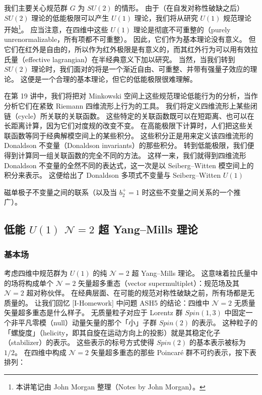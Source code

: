 我们主要关心规范群 $G$ 为 $SU(2)$ 的情形。
由于（在自发对称性破缺之后）$SU(2)$ 理论的低能极限可以产生 $U(1)$ 理论，我们将从研究 $U(1)$ 规范理论开始\footnote{本讲笔记由 John Morgan 整理（Notes by John Morgan）。}。
应当注意，在四维中这些 $U(1)$ 理论是彻底不可重整的（purely unrenormalizable，所有项都不可重整）。
因此，它们作为基本理论没有意义。
但它们在红外是自由的，所以作为红外极限是有意义的，而其红外行为可以用有效拉氏量（effective lagrangian）在半经典意义下加以研究。
当然，当我们转到 $SU(2)$ 理论时，我们面对的将是一个渐近自由、可重整、并带有强量子效应的理论。
这便是一个合理的基本理论，但它的低能极限很难理解。

在第 19 讲中，我们将把对 Minkowski 空间上这些规范理论低能行为的分析，当作分析它们在紧致 Riemann 四维流形上行为的工具。
我们将定义四维流形上某些闭链（cycle）所关联的关联函数。
这些特定的关联函数既可以在短距离、也可以在长距离计算，因为它们对度规的改变不变。
在高能极限下计算时，人们把这些关联函数等同于经典解模空间上的某些积分。
这些积分正是用来定义该四维流形的 Donaldson 不变量（Donaldson invariants）的那些积分。
转到低能极限，我们便得到计算同一组关联函数的完全不同的方法。
这样一来，我们就得到四维流形 Donaldson 不变量的全然不同的表达式，这一次是以 Seiberg--Witten 模空间上的积分来表示。
这便给出了 Donaldson 多项式不变量与 Seiberg--Witten $U(1)$


磁单极子不变量之间的联系（以及当 $b_2^+=1$ 时这些不变量之间关系的一个推广）。

\subsection{低能 $U(1)$ $\mathcal{N}=2$ 超 Yang--Mills 理论}

\subsubsection{基本场}

考虑四维中规范群为 $U(1)$ 的纯 $\mathcal{N}=2$ 超 Yang--Mills 理论。
这意味着拉氏量中的场将构成单个 $\mathcal{N}=2$ 矢量超多重态（vector supermultiplet）：规范场及其 $\mathcal{N}=2$ 超对称伙伴。
在经典层面、在可能的规范对称性破缺之前，所有场都是无质量的。
让我们回忆 [I-Homework] 中问题 ASH5 的结论：四维中 $\mathcal{N}=2$ 无质量矢量超多重态是什么样子。
无质量粒子对应于 Lorentz 群 $Spin(1,3)$ 中固定一个非平凡零模（null）动量矢量的那个「小」子群 $Spin(2)$ 的表示。
这种粒子的「螺旋度」（helicity，即其自旋在运动方向上的投影）就是其稳定化子（stabilizer）的表示。
这些表示的标号方式使得 $Spin(2)$ 的基本表示被标为 $1/2$。
在四维中构成 $\mathcal{N}=2$ 矢量超多重态的那些 Poincaré 群不可约表示，按下表排列：

